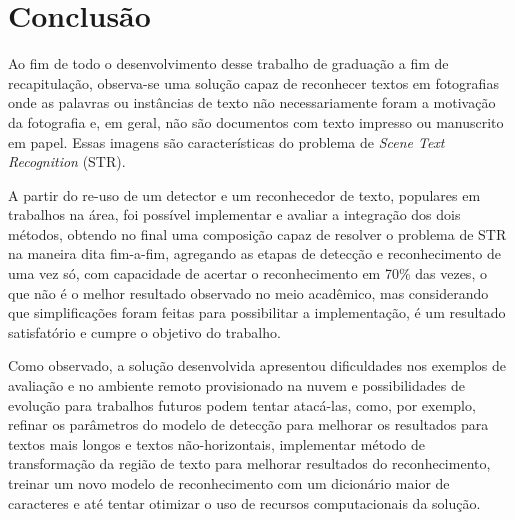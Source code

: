 \chapter{Conclusão}

Ao fim de todo o desenvolvimento desse trabalho de graduação a fim de recapitulação, observa-se uma solução capaz 
de reconhecer textos em fotografias onde as palavras ou instâncias de texto não necessariamente foram a motivação 
da fotografia e, em geral, não são documentos com texto impresso ou manuscrito em papel. Essas imagens são características 
do problema de \textit{Scene Text Recognition} (STR).

A partir do re-uso de um detector e um reconhecedor de texto, populares em trabalhos na área, foi possível implementar 
e avaliar a integração dos dois métodos, obtendo no final uma composição capaz de resolver o problema de STR na 
maneira dita fim-a-fim, agregando as etapas de detecção e reconhecimento de uma vez só, com capacidade de acertar o 
reconhecimento em 70\% das vezes, o que não é o melhor resultado observado no meio acadêmico, mas considerando que 
simplificações foram feitas para possibilitar a implementação, é um resultado satisfatório e cumpre o objetivo do trabalho.

Como observado, a solução desenvolvida apresentou dificuldades nos exemplos de avaliação e no ambiente remoto 
provisionado na nuvem e possibilidades de evolução para trabalhos futuros podem tentar atacá-las, como, por exemplo, 
refinar os parâmetros do modelo de detecção para melhorar os resultados para textos mais longos e textos não-horizontais, 
implementar método de transformação da região de texto para melhorar resultados do reconhecimento, treinar um novo modelo de 
reconhecimento com um dicionário maior de caracteres e até tentar otimizar o uso de recursos computacionais da solução.
